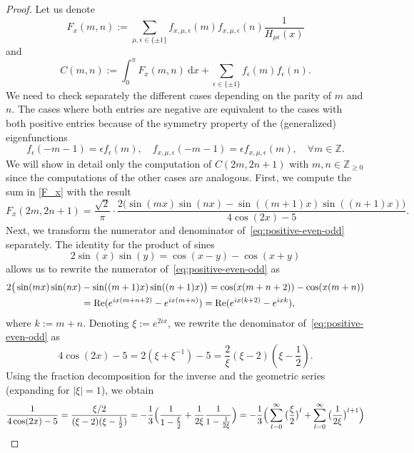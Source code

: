 \documentclass[11pt]{amsart}
\newcommand{\Z}{\mathbb{Z}}
\theoremstyle{definition}
\theoremstyle{remark}
\theoremstyle{plain}
\numberwithin{equation}{section}
\numberwithin{lemma}{section}
\numberwithin{definition}{section}
\numberwithin{proposition}{section}
\numberwithin{corollary}{section}
\numberwithin{theorem}{section}
\numberwithin{remark}{section}
\begin{document}
\begin{proof}
 Let us denote
\begin{equation}
 F_x(m,n):=\sum_{\mu,\epsilon\in\{\pm1\}}f_{x,\mu,\epsilon}(m)f_{x,\mu,\epsilon}(n)\frac{1}{H_{\mu\epsilon}(x)} \label{F_x}
\end{equation}
 and
\begin{equation}
  C(m,n):=\int_0^\pi F_x(m,n) \ \mathrm{d}x +\sum_{\epsilon\in\{\pm1\}}f_\epsilon(m)f_\epsilon(n). \label{C_x}
\end{equation}
 We need to check separately the different cases depending on the parity of $m$ and $n$. 
The cases where both entries are negative are equivalent to the cases with both positive entries because of the symmetry property of the (generalized) eigenfunctions
$$
f_\epsilon(-m-1)=\epsilon f_\epsilon(m), \quad f_{x,\mu, \epsilon}(-m-1)=\epsilon f_{x,\mu, \epsilon}(m), \quad \forall m\in\Z.
$$
We will show in detail only the computation of $C(2m,2n+1)$ with $m,n\in\Z_{\ge0}$ since 
the computations of the other cases are analogous.
First, we compute the sum in \eqref{F_x} with the result
\begin{equation}\label{eq:positive-even-odd}
F_x(2m,2n+1)=\frac{\sqrt{2}}{\pi} \cdot \frac{2\big( \sin(mx)\sin(nx)-\sin((m+1)x)\sin((n+1)x)\big)}{4\cos(2x)-5}.
\end{equation}
Next, we transform  the numerator and denominator of~\eqref{eq:positive-even-odd} separately. The identity for the product of sines
$$
2\sin(x)\sin(y)=\cos(x-y)-\cos(x+y)
$$
allows us to rewrite the numerator of~\eqref{eq:positive-even-odd}  as
\begin{align}
 2\big( \sin(mx)\sin(nx) & -\sin((m+1)x)\sin((n+1)x)\big) = \cos(x(m+n+2))-\cos(x(m+n)) \notag \\
 & = \operatorname{Re}(e^{ix(m+n+2)}-e^{ix(m+n)}) = \operatorname{Re}(e^{ix(k+2)}-e^{ixk}), \label{num_ee}
\end{align}
where $k:=m+n$.
Denoting $\xi:=e^{2ix}$, we rewrite the denominator of~\eqref{eq:positive-even-odd}  as
$$
4\cos(2x)-5=2(\xi+\xi^{-1})-5=\frac{2}{\xi}(\xi-2)(\xi-\frac{1}{2}).
$$
Using the fraction decomposition for the inverse and the geometric series (expanding for $|\xi|=1$), we obtain
\begin{align}
 \frac{1}{4\cos(2x)-5} &=\frac{\xi/2}{(\xi-2)(\xi-\frac{1}{2})} 
=-\frac{1}{3}\Big(\frac{1}{1-\frac{\xi}{2}}+\frac{1}{2\xi}\frac{1}{1-\frac{1}{2\xi}}\Big) =-\frac{1}{3}\Big(\sum_{l=0}^{\infty}\big(\frac{\xi}{2}\big)^l + \sum_{l=0}^{\infty} \big(\frac{1}{2\xi}\big)^{l+1} \Big) \notag \\ 

\end{align}
\end{proof}
\end{document}
